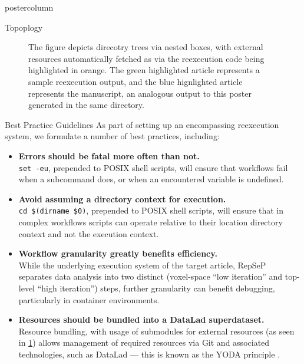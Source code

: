 \begin{frame}
\begin{columns}
\begin{column}{.42\textwidth}
\begin{beamercolorbox}[center]{postercolumn}
\begin{minipage}{.98\textwidth}
{\begin{myblock}{Topoplogy}
\begin{figure}
{								The figure depicts direcotry trees via nested boxes, with external resources automatically fetched as via the reexecution code being highlighted in orange.
								The green highlighted article represents a sample reexecution output, and the blue hignlighted article represents the manuscript, an analogous output to this poster generated in the same directory.
							}
							\label{fig:workflow}
						\end{figure}
					\end{myblock}\vfill
					\begin{myblock}{Best Practice Guidelines}
						\vspace{0.5em}
						As part of setting up an encompassing reexecution system, we formulate a number of best practices, including:
						\begin{itemize}
							\item \textbf{Errors should be fatal more often than not.}\\
								\colorbox{elg}{\texttt{set -eu}}, prepended to POSIX shell scripts, will ensure that workflows fail when a subcommand does, or when an encountered variable is undefined.
							\item \textbf{Avoid assuming a directory context for execution.}\\
								\colorbox{elg}{\texttt{cd \textquotedbl\$(dirname \textquotedbl\$0\textquotedbl)\textquotedbl}}, prepended to POSIX shell scripts, will ensure that in complex workflows scripts can operate relative to their location directory context and not the execution context.
							\item \textbf{Workflow granularity greatly benefits efficiency.}\\
								While the underlying execution system of the target article, RepSeP \cite{repsep} separates data analysis into two distinct (voxel-space “low iteration” and top-level “high iteration”) steps, further granularity can benefit debugging, particularly in container environments.
							\item \textbf{Resources should be bundled into a DataLad superdataset.}\\
								Resource bundling, with usage of submodules for external resources (as seen in \cref{fig:workflow}) allows management of required resources via Git and associated technologies, such as DataLad \cite{datalad} — this is known as the YODA principle \cite{yoda}.

\end{itemize}
\end{myblock}}
\end{minipage}
\end{beamercolorbox}
\end{column}
\end{columns}
\end{frame}
